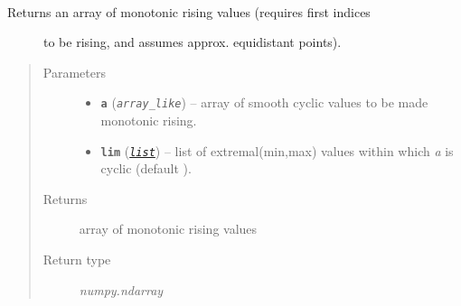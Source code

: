 \documentclass[letterpaper,10pt,english]{sphinxhowto}
\begin{document}
\begin{fulllineitems}
\label{swtools_doc:swtools.cyclic2rising}~\begin{description}
\item[{Returns an array of monotonic rising values (requires first indices}] \leavevmode
to be rising, and assumes approx. equidistant points).

\end{description}
\begin{quote}\begin{description}
\item[{Parameters}] \leavevmode\begin{itemize}
\item {} 
\textbf{\texttt{a}} (\emph{\texttt{array\_like}}) -- array of smooth cyclic values to be made monotonic rising.

\item {} 
\textbf{\texttt{lim}} (\href{https://docs.python.org/library/functions.html\#list}{\emph{\texttt{list}}}) -- list of extremal(min,max) values within which \emph{a} is cyclic
(default \code{{[}-90,90{]}}).

\end{itemize}

\item[{Returns}] \leavevmode
array of monotonic rising values

\item[{Return type}] \leavevmode
\emph{numpy.ndarray}

\end{description}\end{quote}

\end{fulllineitems}

\end{document}
